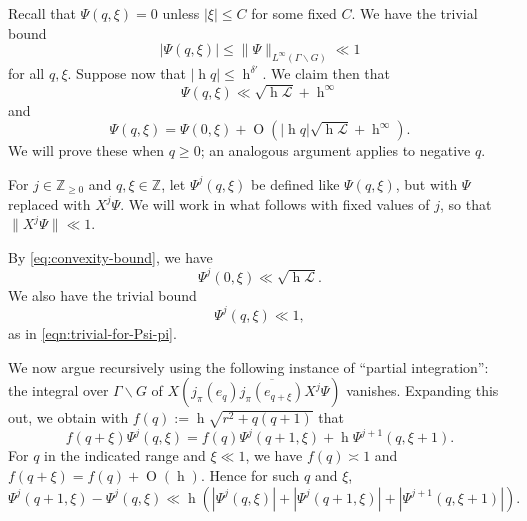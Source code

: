 \documentclass[reqno,10pt]{amsart}
\theoremstyle{plain} %
\theoremstyle{definition}
\theoremstyle{plain} %
\theoremstyle{remark}
\theoremstyle{itplain} %
\theoremstyle{remark} %
\renewcommand{\geq}{\geqslant}
\renewcommand{\leq}{\leqslant}
\numberwithin{equation}{section}
\def\O{\operatorname{O}}
\DeclareMathOperator{\h}{h}
\begin{document}
Recall that $\Psi(q,\xi) = 0$ unless $|\xi| \leq C$ for some fixed $C$.  We have the trivial bound
\begin{equation}\label{eqn:trivial-for-Psi-pi}
  |\Psi(q,\xi)| \leq \|\Psi \|_{L^\infty(\Gamma \backslash G)}
  \ll 1
\end{equation}
for all $q, \xi$.  Suppose now that $|\h q| \leq \h^{\delta '}$.  We claim then that
\begin{equation}\label{eqn:Psi-pi-triv}
  \Psi(q,\xi) \ll \sqrt{\h \mathcal{L} } + \h^{\infty}
\end{equation}
and
\begin{equation}\label{eqn:Psi-pi-lipschitz}
  \Psi(q,\xi) =
  \Psi(0,\xi)
  + \O(|\h q| \sqrt{\h \mathcal{L}}  + \h^{\infty}).
\end{equation}
We will prove these when $q \geq 0$; an analogous argument applies to negative $q$.

For $j \in \mathbb{Z}_{\geq 0}$ and $q,\xi \in \mathbb{Z}$, let $\Psi^j(q,\xi)$ be defined like $\Psi(q,\xi)$, but with $\Psi$ replaced with $X^j \Psi$.  We will work in what follows with fixed values of $j$, so that $\|X^j \Psi \| \ll 1$.

By \eqref{eq:convexity-bound}, we have
\begin{equation}\label{eqn:woodbury-stirling}
  \Psi^j(0,\xi)
  \ll \sqrt{\h \mathcal{L} }.
\end{equation}
We also have the trivial bound
\begin{equation}\label{eqn:trivial-Psi-j}
  \Psi^j(q,\xi)
  \ll 1,
\end{equation}
as in \eqref{eqn:trivial-for-Psi-pi}.

We now argue recursively using the following instance of ``partial integration'': the integral over $\Gamma \backslash G$ of $X (j_\pi(e_q) \overline{j_\pi(e_{q+\xi})} X^j \Psi)$ vanishes.  Expanding this out, we obtain with $f(q) := \h \sqrt{r^2 + q(q+1)}$ that
\[
  f(q+\xi) \Psi^j(q,\xi) = f(q) \Psi^j(q+1,\xi) + \h \Psi^{j+1}(q,\xi+1).
\]
For $q$ in the indicated range and $\xi \ll 1$, we have $f(q) \asymp 1$ and $f(q+\xi) = f(q) + \O(\h)$.  Hence for such $q$ and $\xi$,
\begin{equation}\label{eqn:Psi-pi-j-main-recursive-bound}
  \Psi^j(q+1,\xi)
  -
  \Psi^j(q,\xi)
  \ll
  \h (
  \left\lvert \Psi^j(q,\xi) \right\rvert
  +
  \left\lvert \Psi^j(q+1,\xi) \right\rvert
  +
  \left\lvert \Psi^{j+1}(q,\xi+1) \right\rvert
  ).
\end{equation}
\end{document}
